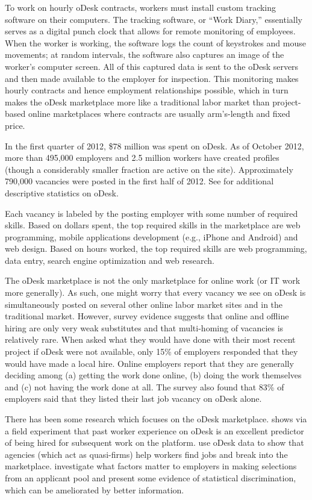 \documentclass[prodmode,acmec]{ec-acmsmall}
\begin{document}
To work on hourly oDesk contracts, workers must install custom tracking software on their computers. 
The tracking software, or ``Work Diary,'' essentially serves as a digital punch clock that allows for remote monitoring of employees. 
When the worker is working, the software logs the count of keystrokes and mouse movements; at random intervals, the software also captures an image of the worker's computer screen. 
All of this captured data is sent to the oDesk servers and then made available to the employer for inspection. 
This monitoring makes hourly contracts and hence employment relationships possible, which in turn makes the oDesk marketplace more like a traditional labor market than project-based online marketplaces where contracts are usually arm's-length and fixed price.  

In the first quarter of 2012, \$78 million was spent on oDesk. 
As of October 2012, more than 495,000 employers and 2.5 million workers have created profiles (though a considerably smaller fraction are active on the site). Approximately 790,000 vacancies were posted in the first half of 2012. 
See \cite{agrawal2013digitization} for additional descriptive statistics on oDesk. 

Each vacancy is labeled by the posting employer with some number of required skills. 
Based on dollars spent, the top required skills in the marketplace are web programming, mobile applications development (e.g., iPhone and Android) and web design. 
Based on hours worked, the top required skills are web programming, data entry, search engine optimization and web research. 

The oDesk marketplace is not the only marketplace for online work (or IT work more generally). 
As such, one might worry that every vacancy we see on oDesk is simultaneously posted on several other online labor market sites and in the traditional market. However, survey evidence suggests that online and offline hiring are only very weak substitutes and that multi-homing of vacancies is relatively rare. When asked what they would have done with their most recent project if oDesk were not available, only 15\% of employers responded that they would have made a local hire. Online employers report that they are generally deciding among (a) getting the work done online, (b) doing the work themselves and (c) not having the work done at all. The survey also found that 83\% of employers said that they listed their last job vacancy on oDesk alone. 

There has been some research which focuses on the oDesk marketplace. 
\cite{pallais2010inefficient} shows via a field experiment that past worker experience on oDesk is an excellent predictor of being hired for subsequent work on the platform. 
\cite{stanton2011landing} use oDesk data to show that agencies (which act as quasi-firms) help workers find jobs and break into the marketplace. 
\cite{agrawal2012online} investigate what factors matter to employers
in making selections from an applicant pool and present some evidence of statistical discrimination, which can be ameliorated by better information.  
\end{document}
